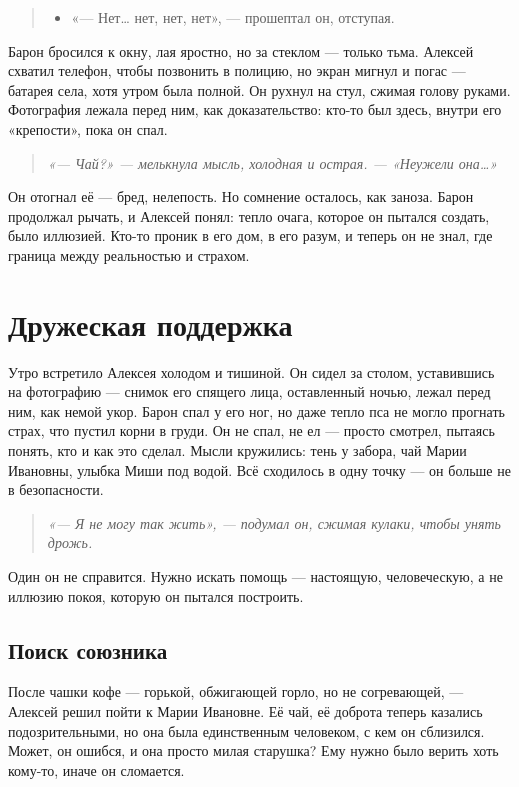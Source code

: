 \documentclass[12pt,a4paper]{book}
\newenvironment{dialogue}{\begin{quote}\itshape\begin{itemize}\item[]}{\end{itemize}\end{quote}}
\newenvironment{innerthought}{\begin{quote}\small\itshape}{\end{quote}}
\begin{document}
\begin{dialogue}
«— Нет… нет, нет, нет», — прошептал он, отступая.
\end{dialogue}

Барон бросился к окну, лая яростно, но за стеклом — только тьма. Алексей схватил телефон, чтобы позвонить в полицию, но экран мигнул и погас — батарея села, хотя утром была полной. Он рухнул на стул, сжимая голову руками. Фотография лежала перед ним, как доказательство: кто-то был здесь, внутри его «крепости», пока он спал.

\begin{innerthought}
«— Чай?» — мелькнула мысль, холодная и острая. — «Неужели она…»
\end{innerthought}

Он отогнал её — бред, нелепость. Но сомнение осталось, как заноза. Барон продолжал рычать, и Алексей понял: тепло очага, которое он пытался создать, было иллюзией. Кто-то проник в его дом, в его разум, и теперь он не знал, где граница между реальностью и страхом.

\chapter{Дружеская поддержка}

Утро встретило Алексея холодом и тишиной. Он сидел за столом, уставившись на фотографию — снимок его спящего лица, оставленный ночью, лежал перед ним, как немой укор. Барон спал у его ног, но даже тепло пса не могло прогнать страх, что пустил корни в груди. Он не спал, не ел — просто смотрел, пытаясь понять, кто и как это сделал. Мысли кружились: тень у забора, чай Марии Ивановны, улыбка Миши под водой. Всё сходилось в одну точку — он больше не в безопасности.

\begin{innerthought}
«— Я не могу так жить», — подумал он, сжимая кулаки, чтобы унять дрожь.
\end{innerthought}

Один он не справится. Нужно искать помощь — настоящую, человеческую, а не иллюзию покоя, которую он пытался построить.

\section{Поиск союзника}

После чашки кофе — горькой, обжигающей горло, но не согревающей, — Алексей решил пойти к Марии Ивановне. Её чай, её доброта теперь казались подозрительными, но она была единственным человеком, с кем он сблизился. Может, он ошибся, и она просто милая старушка? Ему нужно было верить хоть кому-то, иначе он сломается.
\end{document}
